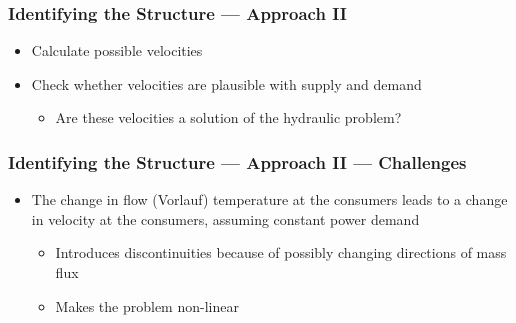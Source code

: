 \documentclass{beamer}
\begin{document}
\begin{frame}
\frametitle{Identifying the Structure --- Approach II}
  \begin{itemize}
    \item Calculate possible velocities
    \item Check whether velocities are plausible with supply and demand
    \begin{itemize}
      \item Are these velocities a solution of the hydraulic problem?
    \end{itemize}
  \end{itemize}

  \begin{figure}
  \end{figure}
\end{frame}

\begin{frame}
\frametitle{Identifying the Structure --- Approach II --- Challenges}
  \begin{itemize}
    \item The change in flow (Vorlauf) temperature at the consumers leads to a change in velocity at the consumers, assuming constant power demand
    \begin{itemize}
      \item Introduces discontinuities because of possibly changing directions of mass flux
      \item Makes the problem non-linear
    \end{itemize}
  \end{itemize}
\end{frame}
\end{document}
